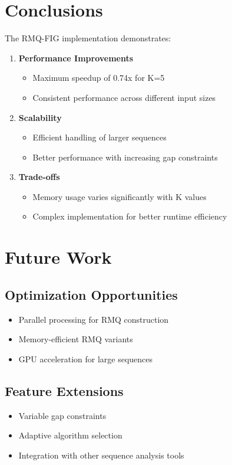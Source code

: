 \documentclass{article}
\begin{document}
\section{Conclusions}

The RMQ-FIG implementation demonstrates:

\begin{enumerate}
    \item \textbf{Performance Improvements}
    \begin{itemize}
        \item Maximum speedup of 0.74x for K=5
        \item Consistent performance across different input sizes
    \end{itemize}

    \item \textbf{Scalability}
    \begin{itemize}
        \item Efficient handling of larger sequences
        \item Better performance with increasing gap constraints
    \end{itemize}

    \item \textbf{Trade-offs}
    \begin{itemize}
        \item Memory usage varies significantly with K values
        \item Complex implementation for better runtime efficiency
    \end{itemize}
\end{enumerate}

\section{Future Work}

\subsection{Optimization Opportunities}
\begin{itemize}
    \item Parallel processing for RMQ construction
    \item Memory-efficient RMQ variants
    \item GPU acceleration for large sequences
\end{itemize}

\subsection{Feature Extensions}
\begin{itemize}
    \item Variable gap constraints
    \item Adaptive algorithm selection
    \item Integration with other sequence analysis tools
\end{itemize}
\end{document}
